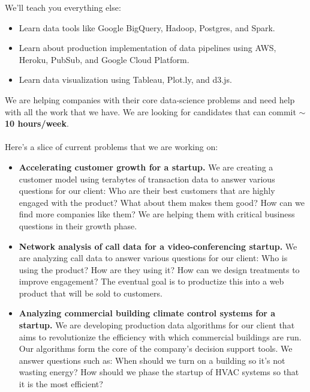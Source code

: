 \documentclass[11pt]{article}
\begin{document}
\begin{titlepage}
\noindent We'll teach you everything else:
\begin{itemize}
	\item Learn data tools like Google BigQuery, Hadoop, Postgres, and Spark.  
	\item Learn about production implementation of data pipelines using AWS, Heroku, PubSub, and Google Cloud Platform. 
	\item Learn data visualization using Tableau, Plot.ly, and d3.js.  
\end{itemize}

\noindent We are helping companies with their core data-science problems and need help with all the work that we have.  We are looking for candidates that can commit $\sim$\textbf{10 hours/week}.  
\\
\\
\noindent Here’s a slice of current problems that we are working on: 

\begin{itemize}

	\item \textbf{Accelerating customer growth for a startup.}  We are creating a customer model using terabytes of transaction data to answer various questions for our client:  Who are their best customers that are highly engaged with the product?  What about them makes them good?  How can we find more companies like them?  We are helping them with critical business questions in their growth phase.
 
	\item \textbf{Network analysis of call data for a video-conferencing startup.}  We are analyzing call data to answer various questions for our client:  Who is using the product?  How are they using it?  How can we design treatments to improve engagement? The eventual goal is to productize this into a web product that will be sold to customers.
	   
	\item \textbf{Analyzing commercial building climate control systems for a startup.}  We are developing production data algorithms for our client that aims to revolutionize the efficiency with which commercial buildings are run. Our algorithms form the core of the company’s decision support tools.  We answer questions such as: When should we turn on a building so it’s not wasting energy?  How should we phase the startup of HVAC systems so that it is the most efficient? 
	
\end{itemize}



\end{titlepage}


\newpage





\end{document}
